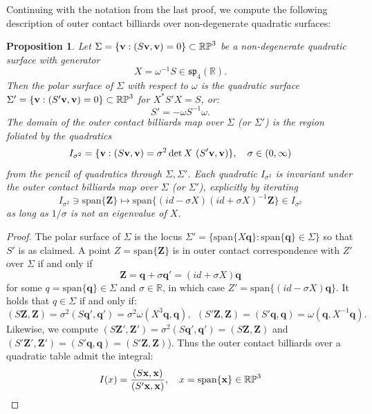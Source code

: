 \documentclass{article}
\newcommand{\R}{\mathbb{R}} %
\newtheorem{prop}{Proposition}[section]
\begin{document}
\begin{appendix}
Continuing with the notation from the last proof, we compute the following description of outer contact billiards over non-degenerate quadratic surfaces:
\begin{prop}\label{prop:QuadR4}
    Let $\Sigma = \{ {\bf v} : (S{\bf v},{\bf v}) = 0\}\subset\mathbb{RP}^3$ be a non-degenerate quadratic surface with generator
    \[ X = \omega^{-1}S \in \mathfrak{sp}_4(\R).\]
    Then the polar surface of $\Sigma$ with respect to $\omega$ is the quadratic surface $\Sigma' = \{ {\bf v} : (S'{\bf v},{\bf v}) = 0\}\subset\mathbb{RP}^3$ for $X^*S'X = S$, or:
    \[ S' = -\omega S^{-1}\omega.\]
    The domain of the outer contact billiards map over $\Sigma$ (or $\Sigma'$) is the region foliated by the quadratics
    \[ I_{\sigma^2} = \{ {\bf v} : (S{\bf v},{\bf v}) = \sigma^2\det X ~(S'{\bf v},{\bf v}) \}, ~~~\sigma\in (0,\infty) \]
    from the pencil of quadratics through $\Sigma, \Sigma'$. Each quadratic $I_{\sigma^2}$ is invariant under the outer contact billiards map over $\Sigma$ (or $\Sigma'$), explicitly by iterating
    \[ I_{\sigma^2} \ni \text{span}\{ \boldsymbol{Z}\}\mapsto \text{span}\{ (id-\sigma X)(id+\sigma X)^{-1}\boldsymbol{Z} \} \in I_{\sigma^2} \]
    as long as $1/\sigma $ is not an eigenvalue of $X$.
\end{prop}
\begin{proof}
    The polar surface of $\Sigma$ is the locus $\Sigma' = \{ \text{span}\{ X\boldsymbol{q} \}: \text{span}\{ \boldsymbol{q}\} \in\Sigma\}$ so that $S'$ is as claimed. A point $Z = \text{span}\{\boldsymbol{Z}\}$ is in outer contact correspondence with $Z'$ over $\Sigma$ if and only if
    \[ \boldsymbol{Z} = \boldsymbol{q} + \sigma \boldsymbol{q'} = (id + \sigma X)\boldsymbol{q} \]
    for some $q = \text{span}\{ \boldsymbol{q}\}\in \Sigma$ and $\sigma\in\R$, in which case $Z' = \text{span}\{ (id - \sigma X)\boldsymbol{q} \}$. It holds that $q\in \Sigma$ if and only if:
    \[ (S\boldsymbol{Z},\boldsymbol{Z}) = \sigma^2 (S\boldsymbol{q'}, \boldsymbol{q'}) = \sigma^2 \omega(X^3\boldsymbol{q}, \boldsymbol{q}), ~~(S'\boldsymbol{Z}, \boldsymbol{Z}) = (S'\boldsymbol{q}, \boldsymbol{q}) = \omega(\boldsymbol{q},X^{-1}\boldsymbol{q}).  \]
    Likewise, we compute $(S\boldsymbol{Z'}, \boldsymbol{Z'}) =  \sigma^2 (S\boldsymbol{q'}, \boldsymbol{q'}) = (S\boldsymbol{Z}, \boldsymbol{Z})$ and $(S'\boldsymbol{Z'}, \boldsymbol{Z'}) =  (S'\boldsymbol{q}, \boldsymbol{q})  = (S'\boldsymbol{Z}, \boldsymbol{Z})$). Thus the outer contact billiards over a quadratic table admit the integral:
    \[ I(x) = \frac{(S{\bf x}, {\bf x})}{(S'{\bf x},{\bf x})}, ~~~x = \text{span}\{{\bf x}\} \in \mathbb{RP}^3 \]

\end{proof}
\end{appendix}
\end{document}
